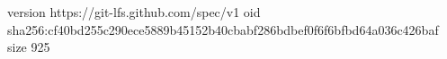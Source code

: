 version https://git-lfs.github.com/spec/v1
oid sha256:cf40bd255c290ece5889b45152b40cbabf286bdbef0f6f6bfbd64a036c426baf
size 925

